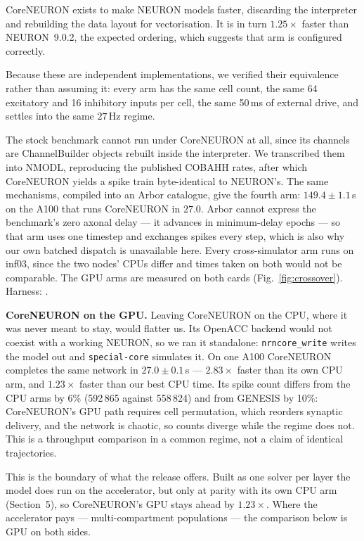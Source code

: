 \documentclass[preprint,12pt, a4paper]{elsarticle}
\begin{document}
\begin{enumerate}
CoreNEURON exists to make NEURON models faster, discarding the interpreter and rebuilding the data layout for vectorisation. It is in turn $1.25\times$ faster than NEURON~9.0.2, the expected ordering, which suggests that arm is configured correctly.

Because these are independent implementations, we verified their equivalence rather than assuming it: every arm has the same cell count, the same 64 excitatory and 16 inhibitory inputs per cell, the same 50\,ms of external drive, and settles into the same $27$\,Hz regime. 

The stock benchmark cannot run under CoreNEURON at all, since its channels are ChannelBuilder objects rebuilt inside the interpreter. We transcribed them into NMODL, reproducing the published COBAHH rates, after which CoreNEURON yields a spike train byte-identical to NEURON's. The same mechanisms, compiled into an Arbor catalogue, give the fourth arm: $149.4\pm1.1$\,s on the A100 that runs CoreNEURON in $27.0$. Arbor cannot express the benchmark's zero axonal delay --- it advances in minimum-delay epochs --- so that arm uses one timestep and exchanges spikes every step, which is also why our own batched dispatch is unavailable here. Every cross-simulator arm runs on inf03, since the two nodes' CPUs differ and times taken on both would not be comparable. The GPU arms are measured on both cards (Fig.~\ref{fig:crossover}). Harness: .

\textbf{CoreNEURON on the GPU.} Leaving CoreNEURON on the CPU, where it was never meant to stay, would flatter us. Its OpenACC backend would not coexist with a working NEURON, so we ran it standalone: \texttt{nrncore\_write} writes the model out and \texttt{special-core} simulates it. On one A100 CoreNEURON completes the same network in $27.0\pm0.1$\,s --- $2.83\times$ faster than its own CPU arm, and $1.23\times$ faster than our best CPU time. Its spike count differs from the CPU arms by 6\% (592\,865 against 558\,824) and from GENESIS by 10\%: CoreNEURON's GPU path requires cell permutation, which reorders synaptic delivery, and the network is chaotic, so counts diverge while the regime does not. This is a throughput comparison in a common regime, not a claim of identical trajectories.

This is the boundary of what the release offers. Built as one solver per layer the model does run on the accelerator, but only at parity with its own CPU arm (Section~5), so CoreNEURON's GPU stays ahead by $1.23\times$. Where the accelerator pays --- multi-compartment populations --- the comparison below is GPU on both sides.


\end{enumerate}
\end{document}
